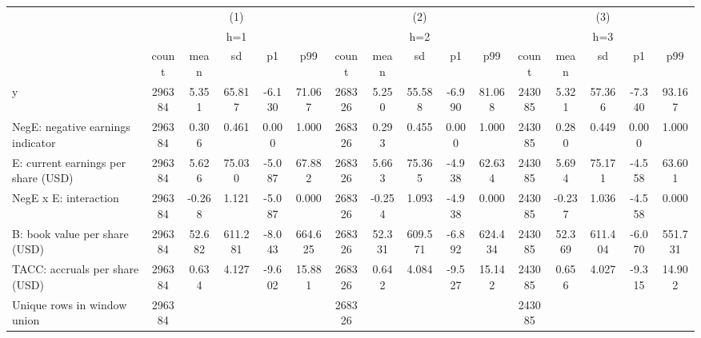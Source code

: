 \begin{tabular}{l*{3}{ccccc}}
\hline\hline
                    &\multicolumn{5}{c}{(1)}                                         &\multicolumn{5}{c}{(2)}                                         &\multicolumn{5}{c}{(3)}                                         \\
                    &\multicolumn{5}{c}{h=1}                                         &\multicolumn{5}{c}{h=2}                                         &\multicolumn{5}{c}{h=3}                                         \\
                    &       count&        mean&          sd&          p1&         p99&       count&        mean&          sd&          p1&         p99&       count&        mean&          sd&          p1&         p99\\
\hline
y                   &      296384&       5.351&      65.817&      -6.130&      71.067&      268326&       5.250&      55.588&      -6.990&      81.068&      243085&       5.321&      57.366&      -7.340&      93.167\\
NegE: negative earnings indicator&      296384&       0.306&       0.461&       0.000&       1.000&      268326&       0.293&       0.455&       0.000&       1.000&      243085&       0.280&       0.449&       0.000&       1.000\\
E: current earnings per share (USD)&      296384&       5.626&      75.030&      -5.087&      67.882&      268326&       5.663&      75.365&      -4.938&      62.634&      243085&       5.694&      75.171&      -4.558&      63.601\\
NegE x E: interaction&      296384&      -0.268&       1.121&      -5.087&       0.000&      268326&      -0.254&       1.093&      -4.938&       0.000&      243085&      -0.237&       1.036&      -4.558&       0.000\\
B: book value per share (USD)&      296384&      52.682&     611.281&      -8.043&     664.625&      268326&      52.331&     609.571&      -6.892&     624.434&      243085&      52.369&     611.404&      -6.070&     551.731\\
TACC: accruals per share (USD)&      296384&       0.634&       4.127&      -9.602&      15.881&      268326&       0.642&       4.084&      -9.527&      15.142&      243085&       0.656&       4.027&      -9.315&      14.902\\
\hline
Unique rows in window union&      296384&            &            &            &            &      268326&            &            &            &            &      243085&            &            &            &            \\

\end{tabular}
